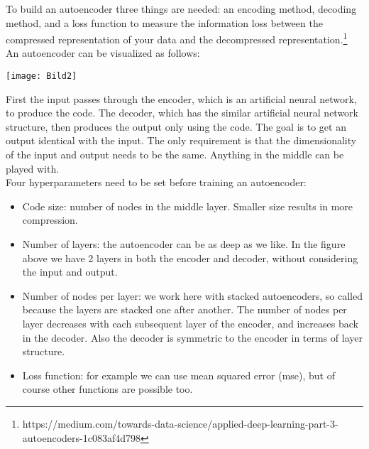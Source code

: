 \documentclass[12pt]{article}
\begin{document}
  To build an autoencoder three things are needed: an encoding method, decoding method, and a loss function to measure the information loss between the compressed representation of your data and the decompressed representation.\footnote{https://medium.com/towards-data-science/applied-deep-learning-part-3-autoencoders-1c083af4d798}\\
  
  An autoencoder can be visualized as follows:\\
  
  \begin{center}
  	\texttt{[image: Bild2]}
  \end{center}
  
   First the input passes through the encoder, which is an artificial neural network, to produce the code. The decoder, which has the similar artificial neural network structure, then produces the output only using the code. The goal is to get an output identical with the input. The only requirement is that the dimensionality of the input and output needs to be the same. Anything in the middle can be played with.\\
   
   Four hyperparameters need to be set before training an autoencoder:
   
    \begin{itemize}
    	
    \item Code size: number of nodes in the middle layer. Smaller size results in more compression.
    
    \item Number of layers: the autoencoder can be as deep as we like. In the figure above we have 2 layers in both the encoder and decoder, without considering the input and output.
    
    \item Number of nodes per layer: we work here with stacked autoencoders, so called because the layers are stacked one after another. The number of nodes per layer decreases with each subsequent layer of the encoder, and increases back in the decoder. Also the decoder is symmetric to the encoder in terms of layer structure.
    
    \item Loss function: for example we can use mean squared error (mse), but of course other functions are possible too.
    \end{itemize}
  
\end{document}
